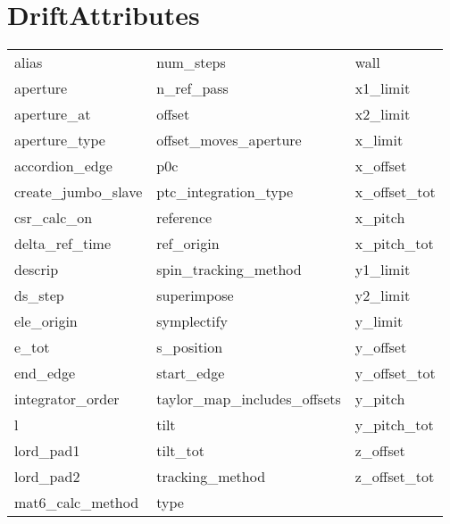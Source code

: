  \section{DriftAttributes}
 \label{s:list.drift}
 
 \begin{tabular}{lll} \toprule
alias                       & num_steps                   & wall                        \\
aperture                    & n_ref_pass                  & x1_limit                    \\
aperture_at                 & offset                      & x2_limit                    \\
aperture_type               & offset_moves_aperture       & x_limit                     \\
accordion_edge              & p0c                         & x_offset                    \\
create_jumbo_slave          & ptc_integration_type        & x_offset_tot                \\
csr_calc_on                 & reference                   & x_pitch                     \\
delta_ref_time              & ref_origin                  & x_pitch_tot                 \\
descrip                     & spin_tracking_method        & y1_limit                    \\
ds_step                     & superimpose                 & y2_limit                    \\
ele_origin                  & symplectify                 & y_limit                     \\
e_tot                       & s_position                  & y_offset                    \\
end_edge                    & start_edge                  & y_offset_tot                \\
integrator_order            & taylor_map_includes_offsets & y_pitch                     \\
l                           & tilt                        & y_pitch_tot                 \\
lord_pad1                   & tilt_tot                    & z_offset                    \\
lord_pad2                   & tracking_method             & z_offset_tot                \\
mat6_calc_method            & type                        &                             \\
 \bottomrule
 \end{tabular}
 \vfill
 
